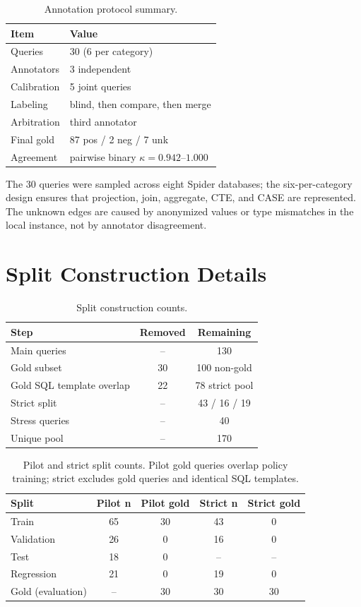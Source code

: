 \documentclass[sigconf, nonacm]{acmart}
\begin{document}
\begin{table}[t]
\centering
\small
\caption{Annotation protocol summary.}
\label{tab:annprotocol}
\begin{tabular}{ll}
\toprule
Item & Value \\
\midrule
Queries & 30 (6 per category) \\
Annotators & 3 independent \\
Calibration & 5 joint queries \\
Labeling & blind, then compare, then merge \\
Arbitration & third annotator \\
Final gold & 87 pos / 2 neg / 7 unk \\
Agreement & pairwise binary $\kappa=0.942$--$1.000$ \\
\bottomrule
\end{tabular}
\end{table}

The 30 queries were sampled across eight Spider databases; the six-per-category design ensures that projection, join, aggregate, CTE, and CASE are represented. The unknown edges are caused by anonymized values or type mismatches in the local instance, not by annotator disagreement.

\section{Split Construction Details}
\label{app:split}

\begin{table}[t]
\centering
\small
\caption{Split construction counts.}
\label{tab:splitsrc}
\begin{tabular}{lcc}
\toprule
Step & Removed & Remaining \\
\midrule
Main queries & -- & 130 \\
Gold subset & 30 & 100 non-gold \\
Gold SQL template overlap & 22 & 78 strict pool \\
Strict split & -- & 43 / 16 / 19 \\
Stress queries & -- & 40 \\
Unique pool & -- & 170 \\
\bottomrule
\end{tabular}
\end{table}

\begin{table}[t]
\centering
\small
\caption{Pilot and strict split counts. Pilot gold queries overlap policy training; strict excludes gold queries and identical SQL templates.}
\label{tab:split}
\begin{tabular}{lcccc}
\toprule
Split & Pilot n & Pilot gold & Strict n & Strict gold \\
\midrule
Train & 65 & 30 & 43 & 0 \\
Validation & 26 & 0 & 16 & 0 \\
Test & 18 & 0 & -- & -- \\
Regression & 21 & 0 & 19 & 0 \\
Gold (evaluation) & -- & 30 & 30 & 30 \\
\bottomrule
\end{tabular}
\end{table}
\end{document}
